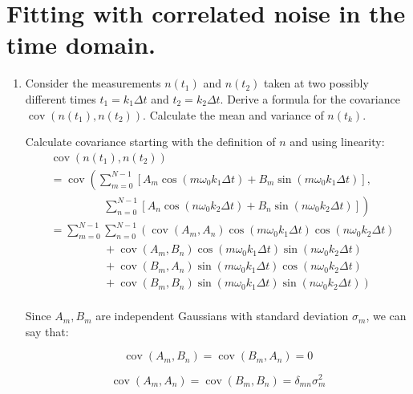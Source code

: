 \section{Fitting with correlated noise in the time domain.}


\begin{enumerate}[label=\textbf{\Alph*}.]
    \item Consider the measurements $n(t_1)$ and $n(t_2)$ taken at two possibly different
    times $t_1 = k_1\Delta t$ and $t_2 = k_2\Delta t$. Derive a formula for the covariance
    $\operatorname{cov}(n(t_1), n(t_2))$. Calculate the mean and variance of $n(t_k)$.

    Calculate covariance starting with the definition of $n$ and using linearity:
    \begin{align*}
        &\operatorname{cov}(n(t_1), n(t_2)) \\
        &= \operatorname{cov}\left(\sum_{m=0}^{N-1}[A_m\cos(m\omega_0 k_1\Delta t) + B_m \sin(m\omega_0 k_1\Delta t)],\right. \\
        &\hspace{2cm}\left.\sum_{n=0}^{N-1}[A_n\cos(n\omega_0 k_2\Delta t) + B_n \sin(n\omega_0 k_2\Delta t)]\right) \\
        &= \sum_{m=0}^{N-1} \sum_{n=0}^{N-1} \left(\operatorname{cov}(A_m, A_n)\cos(m\omega_0 k_1\Delta t)\cos(n\omega_0 k_2\Delta t)\right. \\
        &\hspace{2cm}+ \operatorname{cov}(A_m, B_n)\cos(m\omega_0 k_1\Delta t)\sin(n\omega_0 k_2\Delta t) \\
        &\hspace{2cm}+\operatorname{cov}(B_m, A_n) \sin(m\omega_0 k_1\Delta t)\cos(n\omega_0 k_2\Delta t) \\
        &\hspace{2cm}+\left.\operatorname{cov}(B_m, B_n) \sin(m\omega_0 k_1\Delta t)\sin(n\omega_0 k_2\Delta t)\right) \\
    \end{align*}

    Since $A_m, B_m$ are independent Gaussians with standard deviation $\sigma_m$, we can say that:

    $$\operatorname{cov}(A_m, B_n) = \operatorname{cov}(B_m, A_n) = 0$$

    $$\operatorname{cov}(A_m, A_n) = \operatorname{cov}(B_m, B_n) = \delta_{mn}\sigma_m^2$$


\end{enumerate}
